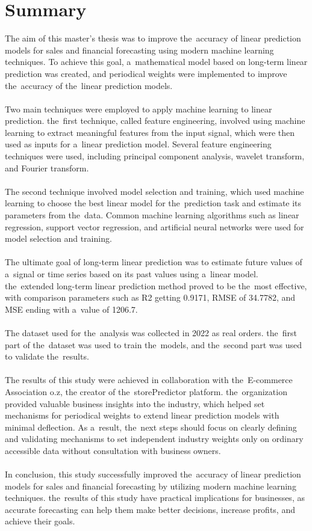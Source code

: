 
\chapter{Summary} \label{summary}
The aim of this master's thesis was to improve the~accuracy of linear prediction models for sales
and financial forecasting using modern machine learning techniques. To achieve this goal, a~mathematical
model based on long-term linear prediction was created, and periodical weights were implemented
to improve the~accuracy of the~linear prediction models.\\
\\
Two main techniques were employed to apply machine learning to linear prediction. the~first technique,
called feature engineering, involved using machine learning to extract meaningful features from
the input signal, which were then used as inputs for a~linear prediction model. Several feature
engineering techniques were used, including principal component analysis, wavelet transform, and
Fourier transform.\\
\\
The second technique involved model selection and training, which used machine learning to choose
the best linear model for the~prediction task and estimate its parameters from the~data. Common machine
learning algorithms such as linear regression, support vector regression, and artificial neural networks
were used for model selection and training.\\
\\
The ultimate goal of long-term linear prediction was to estimate future values of a~signal or time
series based on its past values using a~linear model. the~extended long-term linear prediction method
proved to be the~most effective, with comparison parameters such as R2 getting 0.9171, RMSE of 34.7782, and MSE ending
with a~value of 1206.7.\\
\\
The dataset used for the~analysis was collected in 2022 as real orders. the~first part of the~dataset
was used to train the~models, and the~second part was used to validate the~results.\\
\\
The results of this study were achieved in collaboration with the~E-commerce Association o.z,
the creator of the~storePredictor platform. the~organization provided valuable business insights into
the industry, which helped set mechanisms for periodical weights to extend linear prediction models
with minimal deflection. As a~result, the~next steps should focus on clearly defining and validating
mechanisms to set independent industry weights only on ordinary accessible data without consultation
with business owners.\\
\\
In conclusion, this study successfully improved the~accuracy of linear prediction models for sales
and financial forecasting by utilizing modern machine learning techniques. the~results of this study
have practical implications for businesses, as accurate forecasting can help them make better decisions,
increase profits, and achieve their goals.


